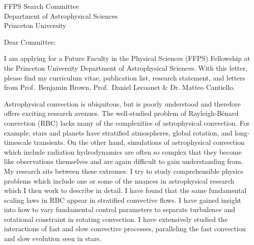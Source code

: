 \documentclass[12pt]{letter}
\begin{document}
\begin{letter}{
               FFPS Search Committee \\
               Department of Astrophysical Sciences \\
               Princeton University
           }

\opening{Dear Committee:}

    I am applying for a Future Faculty in the Physical Sciences (FFPS) Fellowship at the Princeton University Department of Astrophysical Sciences.
    With this letter, please find my curriculum vitae, publication list, research statement, and letters from Prof.~Benjamin Brown, Prof.~Daniel Lecoanet \& Dr. Matteo Cantiello.

    Astrophysical convection is ubiquitous, but is poorly understood and therefore offers exciting research avenues.
    The well-studied problem of Rayleigh-B\'{e}nard convection (RBC) lacks many of the complexities of astrophysical convection.
    For example, stars and planets have stratified atmospheres, global rotation, and long-timescale transients.
    On the other hand, simulations of astrophysical convection which include radiation hydrodynamics are often so complex that they become like observations themselves and are again difficult to gain understanding from.
    My research sits between these extremes: I try to study comprehensible physics problems which include one or some of the nuances in astrophysical research which I then work to describe in detail.
    I have found that the same fundamental scaling laws in RBC appear in stratified convective flows.
    I have gained insight into how to vary fundamental control parameters to separate turbulence and rotational constraint in rotating convection.
    I have extensively studied the interactions of fast and slow convective processes, paralleling the fast convection and slow evolution seen in stars.


\end{letter}
\end{document}

